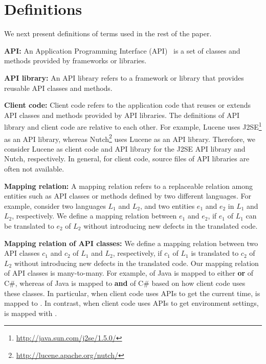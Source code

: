 \section{Definitions}
\label{sec:mapping}

We next present definitions of terms used in the rest of the paper.

\textbf{API:} An Application Programming Interface (API)~\cite{orenstein2000quickstudy}
is a set of classes and methods provided by frameworks or libraries.

\textbf{API library:} An API library refers to a framework
or library that provides reusable API classes and methods.

\textbf{Client code:} Client code refers to the application code
that reuses or extends API classes and methods provided by API
libraries. The definitions of API library and client code are
relative to each other. For example, Lucene uses
J2SE\footnote{\url{http://java.sun.com/j2se/1.5.0/}} as an API
library, whereas Nutch\footnote{\url{http://lucene.apache.org/nutch/}} uses Lucene as
an API library. Therefore, we consider Lucene as client code and API
library for the J2SE API library and Nutch, respectively. In
general, for client code, source files of API libraries are often
not available.

\textbf{Mapping relation:} A mapping relation refers to a
replaceable relation among entities such as API classes or methods
defined by two different languages. For example, consider two
languages $L_1$ and $L_2$, and two entities $e_1$ and $e_2$ in
$L_1$ and $L_2$, respectively. We define a mapping
relation between $e_1$ and $e_2$, if $e_1$ of $L_1$ can be translated to $e_2$ of $L_2$
without introducing new defects in the translated code.

\textbf{Mapping relation of API classes:} We define a mapping
relation between two API classes $c_1$ and $c_2$ of $L_1$
and $L_2$, respectively, if $c_1$ of $L_1$ is
translated to $c_2$ of $L_2$ without introducing new
defects in the translated code. Our mapping relation of API classes
is many-to-many. For example, 
of Java is mapped to either 
\textbf{or}  of C\#,
whereas  of Java is mapped to
 \textbf{and}  of
C\# based on how client code uses these classes. In particular, when
client code uses APIs to get the current time,
 is mapped to .
In contrast, when client code uses APIs to get environment
settings,  is mapped with .

